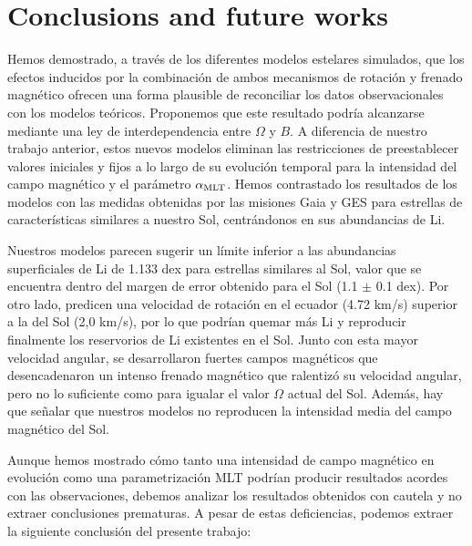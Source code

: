 \section{Conclusions and future works} \label{sec_conclusions}
Hemos demostrado, a través de los diferentes modelos estelares simulados, que los efectos inducidos por la combinación de ambos mecanismos de rotación y frenado magnético ofrecen una forma plausible de reconciliar los datos observacionales con los modelos teóricos. Proponemos que este resultado podría alcanzarse mediante una ley de interdependencia entre $\Omega$ y $B$. A diferencia de nuestro trabajo anterior, estos nuevos modelos eliminan las restricciones de preestablecer valores iniciales y fijos a lo largo de su evolución temporal para la intensidad del campo magnético y el parámetro $\alpha_{\mathrm{MLT}}$. Hemos contrastado los resultados de los modelos con las medidas obtenidas por las misiones Gaia y GES para estrellas de características similares a nuestro Sol, centrándonos en sus abundancias de Li.\par

Nuestros modelos parecen sugerir un límite inferior a las abundancias superficiales de Li de 1.133 dex para estrellas similares al Sol, valor que se encuentra dentro del margen de error obtenido para el Sol (1.1 $\pm$ 0.1 dex). Por otro lado, predicen una velocidad de rotación en el ecuador (4.72 km/s) superior a la del Sol (2,0 km/s), por lo que podrían quemar más Li y reproducir finalmente los reservorios de Li existentes en el Sol. Junto con esta mayor velocidad angular, se desarrollaron fuertes campos magnéticos que desencadenaron un intenso frenado magnético que ralentizó su velocidad angular, pero no lo suficiente como para igualar el valor $\Omega$ actual del Sol. Además, hay que señalar que nuestros modelos no reproducen la intensidad media del campo magnético del Sol.\par

Aunque hemos mostrado cómo tanto una intensidad de campo magnético en evolución como una parametrización MLT podrían producir resultados acordes con las observaciones, debemos analizar los resultados obtenidos con cautela y no extraer conclusiones prematuras. A pesar de estas deficiencias, podemos extraer la siguiente conclusión del presente trabajo:

